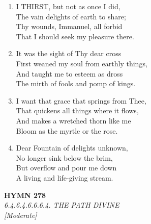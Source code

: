 \documentclass[11pt,a4paper]{article}
\begin{document}
\begin{enumerate}
    \item I THIRST, but not as once I did, \\
        The vain delights of earth to share; \\
        Thy wounds, Immanuel, all forbid \\
        That I should seek my pleasure there.

    \item It was the sight of Thy dear cross \\
        First weaned my soul from earthly things, \\
        And taught me to esteem as dross \\
        The mirth of fools and pomp of kings.

    \item I want that grace that springs from Thee, \\
        That quickens all things where it flows, \\
        And makes a wretched thorn like me \\
        Bloom as the myrtle or the rose.

    \item Dear Fountain of delights unknown, \\
        No longer sink below the brim, \\
        But overflow and pour me down \\
        A living and life-giving stream.

\end{enumerate}

\newpage
\begin{center}
    {\Large \textbf{HYMN 278}}
    \\
    \textit{6.4.6.4.6.6.6.4. THE PATH DIVINE}
    \\
    \textit{\small [Moderate]}
\end{center}
\vspace{1em}
\end{document}
